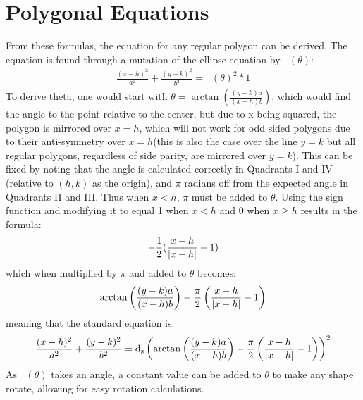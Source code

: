 \documentclass[11pt]{article}
\DeclareMathOperator{\custd}{\mathrm{d}_s}
\DeclareMathOperator{\custdsq}{\mathrm{d}_s}
\DeclarePairedDelimiter\abs{\lvert}{\rvert}%
\begin{document}
\section{Polygonal Equations}
From these formulas, the equation for any regular polygon can be derived. The equation is found through a mutation of the ellipse equation by \(\custd(\theta)\):
\begin{gather*}
\frac{(x-h)^2}{a^2}+\frac{(y-k)^2}{b^2}=\custd(\theta)^2*1
\end{gather*}
To derive theta, one would start with \(\theta=\arctan(\frac{(y-k)a}{(x-h)b})\), which would find the angle to the point relative to the center, but due to x being squared, the polygon is mirrored over \(x=h\), which will not work for odd sided polygons due to their anti-symmetry over \(x=h\)(this is also the case over the line \(y=k\) but all regular polygons, regardless of side parity, are mirrored over \(y=k\)). This can be fixed by noting that the angle is calculated correctly in Quadrants I and IV (relative to \((h,k)\) as the origin), and \(\pi\) radians off from the expected angle in Quadrants II and III. Thus when \(x<h\), \(\pi\) must be added to \(\theta\). Using the sign function and modifying it to equal 1 when \(x<h\) and 0 when \(x\geq h\) results in the formula:
\begin{gather*}
-\frac{1}{2}(\frac{x-h}{\abs{x-h}}-1)
\end{gather*}
which when multiplied by \(\pi\) and added to \(\theta\) becomes:
\begin{gather*}
\arctan\left(\frac{(y-k)a}{(x-h)b}\right)-\frac{\pi}{2}\left(\frac{x-h}{\abs{x-h}}-1\right)
\end{gather*}
meaning that the standard equation is:
\begin{gather*}
\frac{(x-h)^2}{a^2}+\frac{(y-k)^2}{b^2}=\custdsq\left(\arctan\left(\frac{(y-k)a}{(x-h)b}\right)-\frac{\pi}{2}\left(\frac{x-h}{\abs{x-h}}-1\right)\right)^2
\end{gather*}
As \(\custd(\theta)\) takes an angle, a constant value can be added to \(\theta\) to make any shape rotate, allowing for easy rotation calculations.
\end{document}
